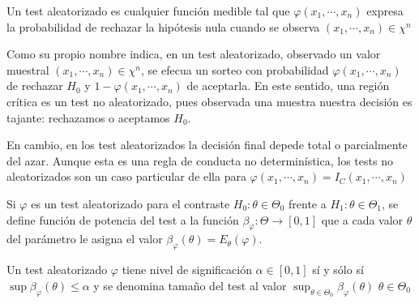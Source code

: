 \begin{definición} 
Un test aleatorizado es cualquier función medible tal que $\varphi\left(x_{1}, \cdots, x_{n}\right)$ expresa la probabilidad de rechazar la hipótesis nula cuando se observa $\left(x_{1}, \cdots, x_{n}\right) \in \chi^{n}$
\end{definición}

\begin{observación}
Como su propio nombre indica, en un test aleatorizado, observado un valor muestral $\left(x_{1}, \cdots, x_{n}\right) \in \chi^{n}$, se efecua un sorteo con probabilidad $\varphi\left(x_{1}, \cdots, x_{n}\right)$ de rechazar $H_{0}$ y $1-\varphi\left(x_{1}, \cdots, x_{n}\right)$ de aceptarla. En este sentido, una región crítica es un test no aleatorizado, pues observada una muestra nuestra decisión es tajante: rechazamos o aceptamos $H_{0}$.

En cambio, en los test aleatorizados la decisión final depede total o parcialmente del azar. Aunque esta es una regla de conducta no determinística, los tests no aleatorizados son un caso particular de ella para $\varphi\left(x_{1}, \cdots, x_{n}\right)=I_{C}\left(x_{1}, \cdots, x_{n}\right)$    
\end{observación}

\begin{definición} 
Si $\varphi$ es un test aleatorizado para el contraste $H_{0}: \theta \in \Theta_{0}$ frente a $H_{1}: \theta \in \Theta_{1}$, se define función de potencia del test a la función $\beta_{\varphi}: \Theta \rightarrow[0,1]$ que a cada valor $\theta$ del parámetro le asigna el valor $\beta_{\varphi}(\theta)=E_{\theta}(\varphi)$.
\end{definición} 

\begin{definición} 
Un test aleatorizado $\varphi$ tiene nivel de significación $\alpha \in[0,1]$ sí y sólo sí $\sup \beta_{\varphi}(\theta) \leq \alpha$ y se denomina tamaño del test al valor $\sup_{\theta \in \Theta_{0}}\beta_{\varphi}(\theta)$ $\theta \in \Theta_{0}$
\end{definición}

